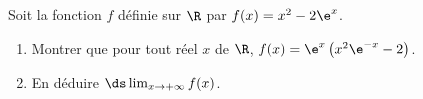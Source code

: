 \medskip

Soit la fonction $f$ définie sur $\R$ par $f(x)=x^2-2\e^{x}$.

\begin{enumerate}
\item  Montrer que pour tout réel $x$ de $\R$, $f(x)=\e^{x}\left (x^2\e^{-x}-2\right )$.
\item En déduire $\ds\lim_{x\to +\infty} f(x)$.
\end{enumerate}

\bigskip
